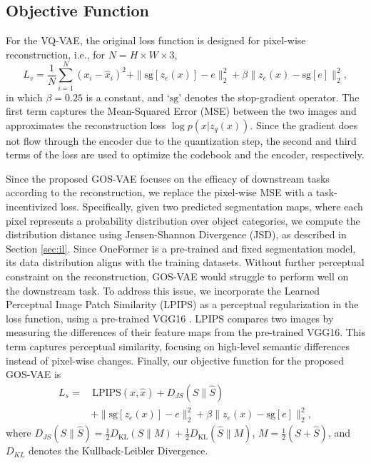 \vspace*{-2mm}

\subsection{Objective Function} \label{sec:obj}

For the VQ-VAE, the original loss function is designed for pixel-wise reconstruction, i.e.,
for $N = H \times W \times 3$,
\begin{equation}
L_{v} = \frac{1}{N} \sum_{i=1}^{N} (x_i - \hat{x}_i)^2 + \|\text{sg}[z_e(x)] - e\|_2^2 + \beta \|z_e(x) - \text{sg}[e]\|_2^2 ,
\end{equation}
in which $\beta=0.25$ is a constant, and `$\text{sg}$' denotes the stop-gradient operator.
The first term captures the Mean-Squared Error (MSE) between the two images and approximates the reconstruction loss $\log p(x|z_q(x))$. Since the gradient does not flow through the encoder due to the quantization step, the second and third terms of the loss are used to optimize the codebook and the encoder, respectively.

Since the proposed GOS-VAE focuses on the efficacy of downstream tasks 
according to the reconstruction, we
replace the pixel-wise MSE with a task-incentivized loss. Specifically, given two predicted segmentation maps, where each pixel represents a probability distribution over object categories, we compute the distribution distance using Jensen-Shannon Divergence (JSD), as described in Section \ref{sec:il}.
Since OneFormer is a pre-trained and fixed segmentation model, its data distribution aligns with the training datasets. Without further perceptual constraint on the reconstruction, GOS-VAE would struggle to perform well on the downstream task. 
To address this issue, we incorporate the Learned Perceptual Image Patch Similarity (LPIPS) \cite{zhang2018unreasonable} as a perceptual regularization in the loss function, using a pre-trained VGG16 \cite{simonyan2014very}. LPIPS compares two images by measuring the differences of their feature maps from the pre-trained VGG16. This term captures perceptual similarity, focusing on high-level semantic differences instead of pixel-wise changes. Finally, our objective function for the proposed GOS-VAE is
\begin{align}
L_{s} = & \, \text{LPIPS}(x, \hat{x}) + D_{JS}(S \parallel \hat{S}) \nonumber \\
        & + \|\text{sg}[z_e(x)] - e\|_2^2 + \beta \|z_e(x) - \text{sg}[e]\|_2^2 ,
\label{eq:5}
\end{align}
where $D_{JS}(S \parallel \hat{S}) = \frac{1}{2} D_\text{KL}(S \parallel M) + \frac{1}{2} D_\text{KL}(\hat{S} \parallel M)$, $M = \frac{1}{2}(S + \hat{S})$, and $D_{KL}$ denotes 
the Kullback-Leibler Divergence.


